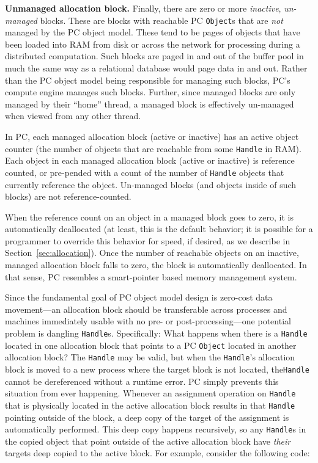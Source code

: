 \vspace{5pt}
\noindent
\textbf{Unmanaged allocation block.} Finally, there are zero or more \emph{inactive},
  \emph{un-managed} blocks.  These are blocks with reachable PC
  \texttt{Object}s that are \emph{not} managed by the PC object model.  These tend to be pages of objects that have
been loaded into RAM from disk or across the network for processing
during a distributed computation.  Such blocks are paged in and out of the
buffer pool in much the same way as a relational database would page data in and out.
Rather than the PC object model being responsible for managing such blocks, PC's compute engine manages such blocks.
Further, since managed blocks are only managed by their ``home'' thread, a managed block is effectively un-managed when viewed from
any other thread.

\vspace{5pt}

In PC, each managed allocation block (active or inactive) has an active object counter (the number of objects that are reachable
from some \texttt{Handle} in RAM).  Each object in each managed allocation block (active or inactive) is reference counted, or pre-pended with a count of
the number of \texttt{Handle} objects that currently reference the object.  
Un-managed blocks (and objects inside of such blocks) are not reference-counted.

When the reference count on an object in a managed block goes to zero, it is automatically
deallocated (at least, this is the default behavior; it is possible
for a programmer to override this behavior for speed, if desired, as
we describe in Section~\ref{sec:allocation}).  
Once the number of reachable objects on an inactive, managed allocation block falls to zero, the block is automatically deallocated.  
In that sense, PC resembles a smart-pointer based memory management system.  

Since the fundamental goal of PC object model design is 
zero-cost data movement---an allocation block should be
transferable across processes and machines immediately usable with no pre- or post-processing---one
potential problem is dangling \texttt{Handle}s.  Specifically: What happens when there is a \texttt{Handle} located in one allocation block that points to a PC
\texttt{Object} located in another allocation block?  The \texttt{Handle} may be valid, but when the \texttt{Handle}'s allocation block is moved to a new process where
the target block is not located, the\texttt{Handle} cannot be dereferenced without a runtime error. 
PC simply prevents this situation from ever happening. Whenever an assignment operation on \texttt{Handle} that is physically located
in the active allocation block results in that
\texttt{Handle} pointing outside of the block, a deep copy of the target of the assignment
is automatically performed.  This deep copy happens recursively, so any \texttt{Handle}s in the copied object that point outside of the active allocation block
have \emph{their} targets deep copied to the active block.  For example, consider the following code:

